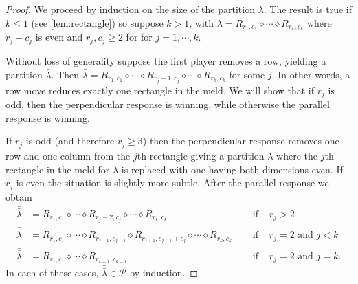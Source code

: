 \documentclass[pdflatex,sn-mathphys-num]{sn-jnl}%
\theoremstyle{thmstyleone}%
\theoremstyle{thmstyletwo}%
\theoremstyle{thmstylethree}%
\newcommand{\p}{\mathcal P}
\begin{document}
\begin{proof}
We proceed by induction on the size of the partition $\lambda$. 
The result is true if $k \le 1$ (see \cref{lem:rectangle}) so suppose $k > 1$, with
 $\lambda = R_{r_1, c_1} \diamond \cdots \diamond R_{r_k, c_k}$ where $r_j + c_j$ is even and $r_j, c_j \geq 2$ for for $j = 1, \cdots, k$. 

Without loss of generality suppose the first player removes a row, yielding a partition $\bar \lambda$. Then $\bar \lambda = R_{r_1, c_1} \diamond \cdots \diamond R_{r_j-1, c_j} \diamond \cdots \diamond R_{r_k, c_k}$ for some $j$. In other words, a row move reduces exactly one rectangle in the meld. 
We will show that if $r_j$ is odd, then the perpendicular response is winning, while otherwise the parallel response is winning.


If $r_j$ is odd (and therefore $r_j\ge 3$) then the perpendicular response removes one row and one column from the $j$th rectangle giving a partition $\bar{\bar \lambda}$ where the $j$th rectangle in the meld for $\lambda$ is replaced with one having both dimensions even. If $r_j$ is even the situation is slightly more subtle. After the parallel response we obtain
\begin{align*}
    \bar {\bar \lambda} &= R_{r_1, c_1} \diamond \cdots \diamond R_{r_j - 2, c_j} \diamond \cdots \diamond R_{r_k, c_k} &  \quad \text{ if }& r_j > 2 \\
    \bar {\bar \lambda} &= R_{r_1, c_1} \diamond \cdots \diamond R_{r_{j-1}, c_{j-1}}
     \diamond R_{r_{j+1}, c_{j+1}+c_j} \diamond \cdots \diamond R_{r_k, c_k} & \quad \text{ if }& r_j = 2 \text{ and } j < k \\
     \bar {\bar \lambda} &= R_{r_1, c_1} \diamond \cdots \diamond R_{r_{k-1}, c_{k-1}} & \quad \text{ if }& r_j = 2 \text{ and } j = k.
\end{align*}
In each of these cases, $\bar {\bar \lambda} \in \p$ by induction. 
\end{proof}
\end{document}
